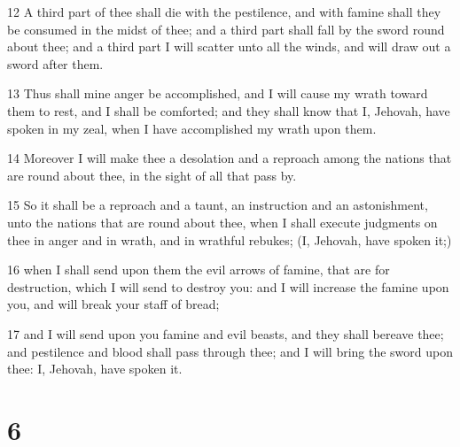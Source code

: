 \par 12 A third part of thee shall die with the pestilence, and with famine shall they be consumed in the midst of thee; and a third part shall fall by the sword round about thee; and a third part I will scatter unto all the winds, and will draw out a sword after them.
\par 13 Thus shall mine anger be accomplished, and I will cause my wrath toward them to rest, and I shall be comforted; and they shall know that I, Jehovah, have spoken in my zeal, when I have accomplished my wrath upon them.
\par 14 Moreover I will make thee a desolation and a reproach among the nations that are round about thee, in the sight of all that pass by.
\par 15 So it shall be a reproach and a taunt, an instruction and an astonishment, unto the nations that are round about thee, when I shall execute judgments on thee in anger and in wrath, and in wrathful rebukes; (I, Jehovah, have spoken it;)
\par 16 when I shall send upon them the evil arrows of famine, that are for destruction, which I will send to destroy you: and I will increase the famine upon you, and will break your staff of bread;
\par 17 and I will send upon you famine and evil beasts, and they shall bereave thee; and pestilence and blood shall pass through thee; and I will bring the sword upon thee: I, Jehovah, have spoken it.

\chapter{6}

